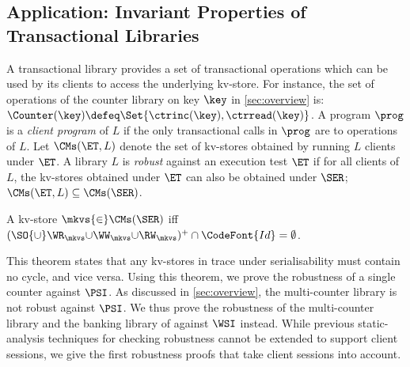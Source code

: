 \subsection{Application: Invariant Properties of Transactional Libraries}
\label{sec:robustness}



A transactional library provides 
a set of transactional operations which can be used by its clients to access the underlying kv-store.
For instance, the set of operations of the counter library on key $\key$ in \cref{sec:overview} is: 
$\Counter(\key) \defeq \Set{\ctrinc(\key), \ctrread(\key)}$.
A program $\prog$ is a \emph{client program} of $L$ if the only transactional calls in $\prog$ are to operations of $L$.  
Let $\CMs(\ET, L)$ denote the set of kv-stores obtained by running $L$ clients under $\ET$.
A library $L$ is \emph{robust} against an execution test
$\ET$ if for all clients of $L$, the kv-stores obtained under $\ET$ can also be obtained under $\SER$; 
\ie $\CMs(\ET, L) \subseteq \CMs(\SER)$.

\spaceshrink{-3pt}
\begin{theorem}
\label{thm:serialisable_nocycle}
A kv-store $\mkvs {\in} \CMs(\SER)$ iff $(\SO {\cup} \WR_{\mkvs} 
{\cup} \WW_{\mkvs} {\cup} \RW_{\mkvs})^{+} \cap \CodeFont{Id} = \emptyset$.%
\end{theorem}
\spaceshrink{-3pt}

This theorem states that any kv-stores in trace under serialisability must contain no cycle, and vice versa.
Using this theorem, we prove the robustness of a single counter against $\PSI$.
As discussed in \cref{sec:overview}, the multi-counter library is not robust against $\PSI$. 
We thus prove the robustness of the multi-counter library and the banking library of \citet{bank-example-wsi} against $\WSI$ instead. 
While previous static-analysis techniques for checking robustness \citep{giovanni_concur16,SIanalysis,laws,sureshConcur}
cannot be extended to support client sessions, 
we give the first robustness proofs that take client sessions into account.



